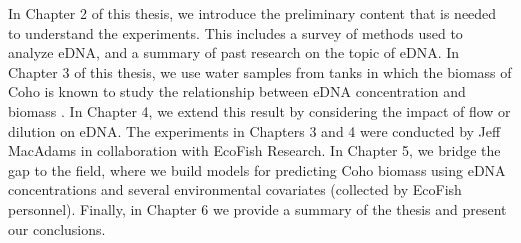  In Chapter 2 of this thesis, we introduce the preliminary content that is needed to understand the experiments. This includes a survey of methods used to analyze eDNA, and a summary of past research on the topic of eDNA. In Chapter 3 of this thesis, we use water samples from tanks in which the biomass of Coho is known to study the relationship between eDNA concentration and biomass \citep{fishforensics}. In Chapter 4, we extend this result by considering the impact of flow or dilution on eDNA. The experiments in Chapters 3 and 4 were conducted by Jeff MacAdams in collaboration with EcoFish Research. In Chapter 5, we bridge the gap to the field, where we build models for predicting Coho biomass using eDNA concentrations and several environmental covariates (collected by EcoFish personnel). Finally, in Chapter 6 we provide a summary of the thesis and present our conclusions.





